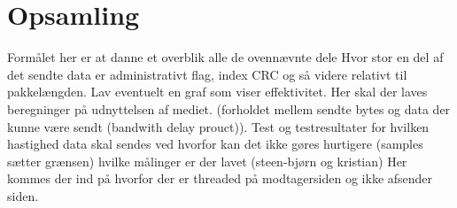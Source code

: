 \section{Opsamling}
Formålet her er at danne et overblik alle de ovennævnte dele
Hvor stor en del af det sendte data er administrativt flag, index CRC og så videre relativt til pakkelængden. Lav eventuelt en graf som viser effektivitet.
Her skal der laves beregninger på udnyttelsen af mediet. (forholdet mellem sendte bytes og data der kunne være sendt (bandwith delay prouct)). 
Test og testresultater for hvilken hastighed data skal sendes ved
hvorfor kan det ikke gøres hurtigere (samples sætter grænsen)
hvilke målinger er der lavet (steen-bjørn og kristian) 
Her kommes der ind på hvorfor der er threaded på modtagersiden og ikke afsender siden. 